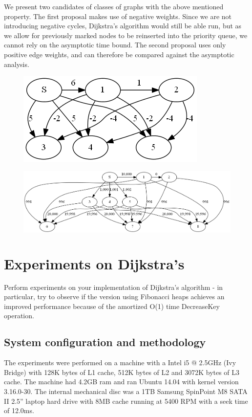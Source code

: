 \documentclass[a4paper,oneside,article,11pt]{memoir}
\begin{document}
We present two candidates of classes of graphs with the above mentioned property. The first proposal makes use of negative weights. Since we are not introducing negative cycles, Dijkstra's algorithm would still be able run, but as we allow for previously marked nodes to be reinserted into the priority queue, we cannot rely on the asymptotic time bound. The second proposal uses only positive edge weights, and can therefore be compared against the asymptotic analysis.

\begin{figure}
\centering
\includegraphics[scale=0.8]{../figures/graph_neg_weights.png}
\caption{}
\label{figure:graph_neg_weights}
\end{figure}

\begin{figure}
\centering
\centerline {
\includegraphics[scale=0.5]{../figures/graph_positive_weights.png}
}
\caption{}
\label{figure:graph_neg_weights}
\end{figure}

\chapter{Experiments on Dijkstra's}
Perform experiments on your implementation of Dijkstra's algorithm - in particular, try to observe if the version using Fibonacci heaps achieves an improved performance because of the amortized O(1) time DecreaseKey operation.

\section{System configuration and methodology}
\label{sec:machine}
The experiments were performed on a machine with a Intel i5 @ 2.5GHz (Ivy Bridge) with 128K bytes of L1 cache, 512K bytes of L2 and 3072K bytes of L3 cache. The machine had 4.2GB ram and ran Ubuntu 14.04 with kernel version 3.16.0-30. The internal mechanical disc was a 1TB Samsung SpinPoint M8 SATA II 2.5'' laptop hard drive with 8MB cache running at 5400 RPM with a seek time of 12.0ms.
\end{document}
